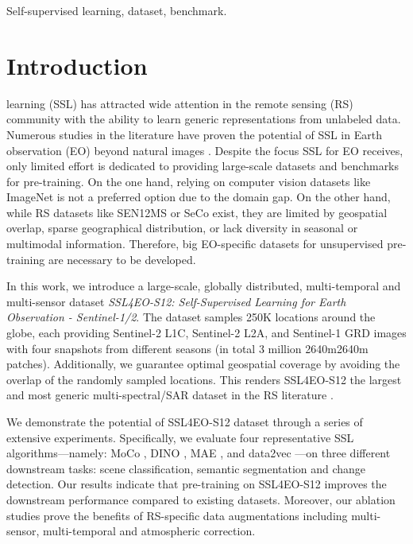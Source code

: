 \documentclass[lettersize,journal]{IEEEtran}
\begin{document}
\begin{IEEEkeywords}
Self-supervised learning, dataset, benchmark.
\end{IEEEkeywords}

\thispagestyle{copyright}

\section{Introduction}

 learning (SSL) has attracted wide attention in the remote sensing (RS) community with the ability to learn generic representations from unlabeled data. Numerous studies in the literature have proven the potential of SSL in Earth observation (EO) beyond natural images \cite{wang2022self1}. Despite the focus SSL for EO receives, only limited effort is dedicated to providing large-scale datasets and benchmarks for pre-training. On the one hand, relying on computer vision datasets like ImageNet \citep{deng2009imagenet} is not a preferred option due to the domain gap. On the other hand, while RS datasets like SEN12MS \cite{Schmitt2019} or SeCo \cite{manas2021seasonal} exist, they are limited by geospatial overlap, sparse geographical distribution, or lack diversity in seasonal or multimodal information. Therefore, big EO-specific datasets for unsupervised pre-training are necessary to be developed.

In this work, we introduce a large-scale, globally distributed, multi-temporal and multi-sensor dataset \textit{SSL4EO-S12: Self-Supervised Learning for Earth Observation - Sentinel-1/2}. The dataset samples 250K locations around the globe, each providing Sentinel-2 L1C, Sentinel-2 L2A, and Sentinel-1 GRD images with four snapshots from different seasons (in total 3 million 2640m2640m patches). Additionally, we guarantee optimal geospatial coverage by avoiding the overlap of the randomly sampled locations. This renders SSL4EO-S12 the largest and most generic multi-spectral/SAR dataset in the RS literature \cite{xiong2022earthnets}.

We demonstrate the potential of SSL4EO-S12 dataset through a series of extensive experiments. Specifically, we evaluate four representative SSL algorithms---namely: MoCo \cite{he2020momentum}, DINO \cite{caron2021emerging}, MAE \cite{he2021masked}, and data2vec \cite{baevski2022data2vec}---on three different downstream tasks: scene classification, semantic segmentation and change detection. Our results indicate that pre-training on SSL4EO-S12 improves the downstream performance compared to existing datasets. Moreover, our ablation studies prove the benefits of RS-specific data augmentations including multi-sensor, multi-temporal and atmospheric correction.
\end{document}
